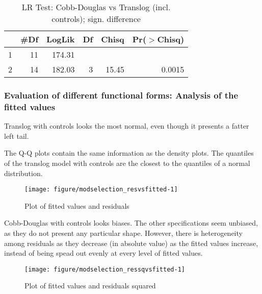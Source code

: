 \documentclass[12pt,a4paper]{article}\usepackage[]{graphicx}\usepackage[]{color}
\newenvironment{knitrout}{}{} %
\begin{document}
\begin{table}[ht]
\centering
\caption{LR Test: Cobb-Douglas vs Translog (incl. controls); sign. difference} 
\label{LR with controls}
\begin{tabular}{lrrrrr}
  \hline
 & \#Df & LogLik & Df & Chisq & Pr($>$Chisq) \\ 
  \hline
1 & 11 & 174.31 &  &  &  \\ 
  2 & 14 & 182.03 & 3 & 15.45 & 0.0015 \\ 
   \hline
\end{tabular}
\end{table}




\subsubsection{Evaluation of different functional forms: Analysis of the fitted values}

Translog with controls looks the most normal, even though it presents a fatter left tail.

The Q-Q plots contain the same information as the density plots. The quantiles of the translog model with controls are the closest to the quantiles of a normal distribution.


\begin{knitrout}
\color{fgcolor}\begin{figure}[htbp]

{\centering \texttt{[image: figure/modselection\_resvsfitted-1]} 

}

\caption[Plot of fitted values and residuals]{Plot of fitted values and residuals}\label{fig:modselection_resvsfitted}
\end{figure}


\end{knitrout}

Cobb-Douglas with controls looks biases. The other specifications seem unbiased, as they do not present any particular shape. However, there is heterogeneity among residuals as they decrease (in absolute value) as the fitted values increase, instead of being spead out evenly at every level of fitted values.


\begin{knitrout}
\color{fgcolor}\begin{figure}[htbp]

{\centering \texttt{[image: figure/modselection\_ressqvsfitted-1]} 

}

\caption[Plot of fitted values and residuals squared]{Plot of fitted values and residuals squared}\label{fig:modselection_ressqvsfitted}
\end{figure}


\end{knitrout}
\end{document}
